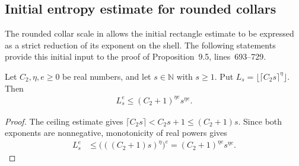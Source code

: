 \subsection{Initial entropy estimate for rounded collars}

The rounded collar scale in \cite[Section~9, lines~32--41]{OpenAI2026AreaLaw}
allows the initial rectangle estimate to be expressed as a strict reduction
of its exponent on the shell. The following statements provide this initial
input to the proof of Proposition~9.5, lines~693--729.

\begin{lemma}
    \label{thm:area_law_rounded_collar_power}
    \leanok
    Let $C_2,\eta,e\ge0$ be real numbers, and let $s\in\mathbb N$ with
    $s\ge1$. Put $L_s=\lfloor\lceil C_2s\rceil^\eta\rfloor$. Then
    \begin{align}
        L_s^e\le(C_2+1)^{\eta e}s^{\eta e}.
    \end{align}
\end{lemma}
\begin{proof}
    \leanok
    The ceiling estimate gives
    $\lceil C_2s\rceil<C_2s+1\le(C_2+1)s$.
    Since both exponents are nonnegative, monotonicity of real powers gives
    \begin{align}
        L_s^e
         & \le\bigl(((C_2+1)s)^\eta\bigr)^e
        =(C_2+1)^{\eta e}s^{\eta e}.
    \end{align}
\end{proof}

